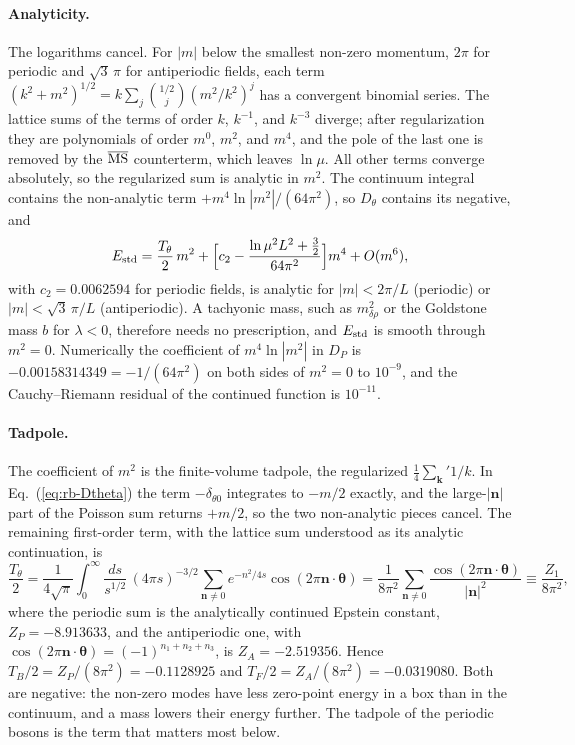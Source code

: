 \paragraph{Analyticity.}
The logarithms cancel.
For $|m|$ below the smallest non-zero momentum, $2\pi$ for periodic and $\sqrt3\,\pi$ for antiperiodic fields, each term $(k^2+m^2)^{1/2}=k\sum_j\binom{1/2}{j}(m^2/k^2)^j$ has a convergent binomial series.
The lattice sums of the terms of order $k$, $k^{-1}$, and $k^{-3}$ diverge; after regularization they are polynomials of order $m^0$, $m^2$, and $m^4$, and the pole of the last one is removed by the $\overline{\mathrm{MS}}$ counterterm, which leaves $\ln\mu$.
All other terms converge absolutely, so the regularized sum is analytic in $m^2$.
The continuum integral contains the non-analytic term $+m^4\ln|m^2|/(64\pi^2)$, so $D_\theta$ contains its negative, and
\begin{equation}
E_{\rm std}=\frac{T_\theta}{2}\,m^2+\Bigl[c_2-\frac{\ln\mu^2L^2+\frac32}{64\pi^2}\Bigr]m^4+O(m^6),
\label{eq:rb-Estd}
\end{equation}
with $c_2=0.0062594$ for periodic fields, is analytic for $|m|<2\pi/L$ (periodic) or $|m|<\sqrt3\,\pi/L$ (antiperiodic). %
A tachyonic mass, such as $m_{\delta\rho}^2$ or the Goldstone mass $b$ for $\lambda<0$, therefore needs no prescription, and $E_{\rm std}$ is smooth through $m^2=0$.
Numerically the coefficient of $m^4\ln|m^2|$ in $D_P$ is $-0.00158314349=-1/(64\pi^2)$ on both sides of $m^2=0$ to $10^{-9}$, and the Cauchy--Riemann residual of the continued function is $10^{-11}$. %

\paragraph{Tadpole.}
The coefficient of $m^2$ is the finite-volume tadpole, the regularized $\frac14\sum_{\bm k}'1/k$.
In Eq.~(\ref{eq:rb-Dtheta}) the term $-\delta_{\theta0}$ integrates to $-m/2$ exactly, and the large-$|\bm n|$ part of the Poisson sum returns $+m/2$, so the two non-analytic pieces cancel.
The remaining first-order term, with the lattice sum understood as its analytic continuation, is
\begin{equation}
\frac{T_\theta}{2}=\frac{1}{4\sqrt\pi}\int_0^\infty\!\frac{ds}{s^{1/2}}\,(4\pi s)^{-3/2}\sum_{\bm n\neq0}e^{-n^2/4s}\cos(2\pi\bm n\cdot\bm\theta)
=\frac{1}{8\pi^2}\sum_{\bm n\neq0}\frac{\cos(2\pi\bm n\cdot\bm\theta)}{|\bm n|^2}\equiv\frac{Z_1}{8\pi^2},
\label{eq:rb-tadpole}
\end{equation}
where the periodic sum is the analytically continued Epstein constant, $Z_P=-8.913633$, and the antiperiodic one, with $\cos(2\pi\bm n\cdot\bm\theta)=(-1)^{n_1+n_2+n_3}$, is $Z_A=-2.519356$. %
Hence $T_B/2=Z_P/(8\pi^2)=-0.1128925$ and $T_F/2=Z_A/(8\pi^2)=-0.0319080$. %
Both are negative: the non-zero modes have less zero-point energy in a box than in the continuum, and a mass lowers their energy further.
The tadpole of the periodic bosons is the term that matters most below.

